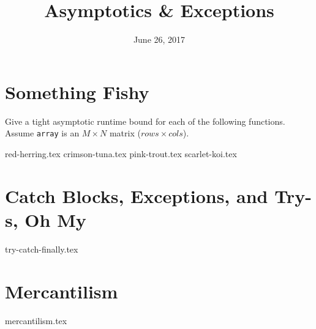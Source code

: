 \documentclass{exam}
\title{Asymptotics \& Exceptions}
\date{June 26, 2017}
\begin{document}
\maketitle

\section{Something Fishy}
Give a tight asymptotic runtime bound for each of the following functions. Assume \texttt{array} is an $M \times N$ matrix ($rows \times cols$).
\begin{questions}
{red-herring.tex}
{crimson-tuna.tex}
{pink-trout.tex}
{scarlet-koi.tex}
\end{questions}

\clearpage

\section{Catch Blocks, Exceptions, and Try-s, Oh My}
\begin{questions}
{try-catch-finally.tex}
\end{questions}

\clearpage

\section{Mercantilism}
\begin{questions}
{mercantilism.tex}
\end{questions}
\end{document}
